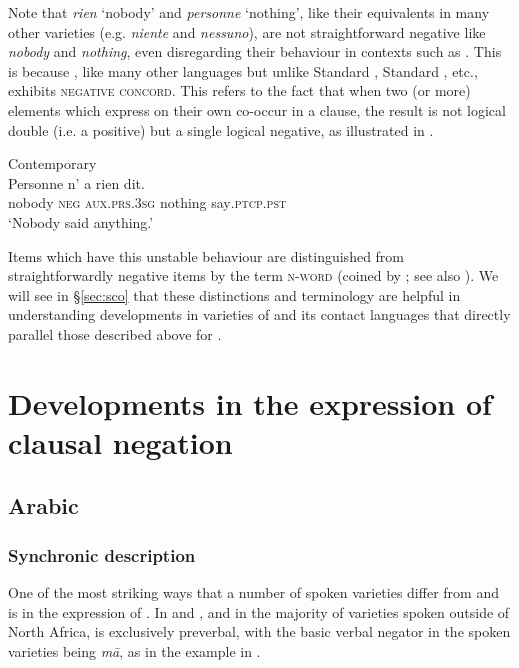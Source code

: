 \documentclass[output=paper]{langsci/langscibook}
\begin{document}
Note that  \textit{rien} ‘nobody’ and \textit{personne} ‘nothing’, like their equivalents in many other  varieties (e.g.  \textit{niente} and \textit{nessuno}), are not straightforward negative  like  \textit{nobody} and \textit{nothing}, even disregarding their behaviour in contexts such as . This is because , like many other languages but unlike {Standard} , {Standard} ,  etc., exhibits \textsc{negative} \textsc{concord}. This refers to the fact that when two (or more) elements which express  on their own co-occur in a clause, the result is not logical double  (i.e. a positive) but a single logical negative, as illustrated in .

\ea\label{cont2}
{       Contemporary  \citep[69]{Hansen2013}} \\
\gll Personne n’ a rien dit.\\
     nobody \textsc{neg} \textsc{aux}.\textsc{prs.3sg} nothing say\textsc{.ptcp.pst}\\
\glt ‘Nobody said anything.’
\z

Items which have this unstable behaviour are distinguished from straightforwardly negative items by the term \textsc{n-word} (coined by \citealt{Laka1990}; see also \citealt{Giannakidou2006}). We will see in §\ref{sec:sco} that these distinctions and terminology are helpful in understanding developments in varieties of  and its contact languages that directly parallel those described above for .


\section{Developments in the expression of clausal negation}\label{sec:dev}
\subsection{Arabic}
\subsubsection{Synchronic description}



One of the most striking ways that a number of spoken  varieties differ from  and   is in the expression of . In  and  , and in the majority of varieties spoken outside of North Africa,  is exclusively preverbal, with the basic verbal negator in the spoken varieties being \textit{mā}, as in the   example in .
\end{document}
